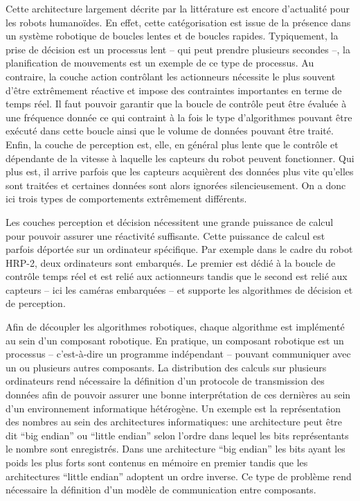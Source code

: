 Cette architecture largement décrite par la littérature est encore
d'actualité pour les robots humanoïdes. En effet, cette catégorisation
est issue de la présence dans un système robotique de boucles lentes
et de boucles rapides. Typiquement, la prise de décision est un
processus lent -- qui peut prendre plusieurs secondes --, la
planification de mouvements est un exemple de ce type de processus. Au
contraire, la couche action contrôlant les actionneurs nécessite le
plus souvent d'être extrêmement réactive et impose des contraintes
importantes en terme de temps réel. Il faut pouvoir garantir que la
boucle de contrôle peut être évaluée à une fréquence donnée ce qui
contraint à la fois le type d'algorithmes pouvant être exécuté dans
cette boucle ainsi que le volume de données pouvant être traité. Enfin,
la couche de perception est, elle, en général plus lente que le
contrôle et dépendante de la vitesse à laquelle les capteurs du robot
peuvent fonctionner. Qui plus est, il arrive parfois que les capteurs
acquièrent des données plus vite qu'elles sont traitées et certaines
données sont alors ignorées silencieusement. On a donc ici trois types
de comportements extrêmement différents.


Les couches perception et décision nécessitent une grande puissance de
calcul pour pouvoir assurer une réactivité suffisante. Cette puissance
de calcul est parfois déportée sur un ordinateur spécifique. Par
exemple dans le cadre du robot HRP-2, deux ordinateurs sont
embarqués. Le premier est dédié à la boucle de contrôle temps réel et
est relié aux actionneurs tandis que le second est relié aux capteurs
-- ici les caméras embarquées -- et supporte les algorithmes de
décision et de perception.


Afin de découpler les algorithmes robotiques, chaque algorithme est
implémenté au sein d'un composant robotique. En pratique, un
composant robotique est un processus -- c'est-à-dire un programme
indépendant -- pouvant communiquer avec un ou plusieurs autres
composants. La distribution des calculs sur plusieurs ordinateurs rend
nécessaire la définition d'un protocole de transmission des données
afin de pouvoir assurer une bonne interprétation de ces dernières au
sein d'un environnement informatique hétérogène. Un exemple est la
représentation des nombres au sein des architectures informatiques:
une architecture peut être dit ``big endian'' ou ``little endian'' selon l'ordre dans lequel les bits représentants le
nombre sont enregistrés. Dans une architecture ``big endian'' les
bits ayant les poids les plus forts sont contenus en mémoire en
premier tandis que les architectures ``little endian'' adoptent un
ordre inverse. Ce type de problème rend nécessaire la définition d'un
modèle de communication entre composants.


